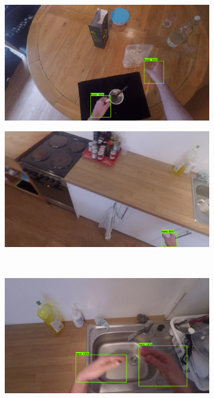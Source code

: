 \documentclass[12pt]{report}
\begin{document}
\begin{figure}[t]
\begin{subfigure}{.5\textwidth}
\centerline{\includegraphics[width=.95\linewidth]{figure/handEval1.png}}
\label{handsA}
\end{subfigure}
\begin{subfigure}{.5\textwidth}
\centerline{\includegraphics[width=.95\linewidth]{figure/handEval2.png}}
\label{handsB}
\end{subfigure}
\\ 
\begin{subfigure}{.5\textwidth}
\centerline{\includegraphics[width=.95\linewidth]{figure/handEval3.png}}

\end{subfigure}
\end{figure}
\end{document}
